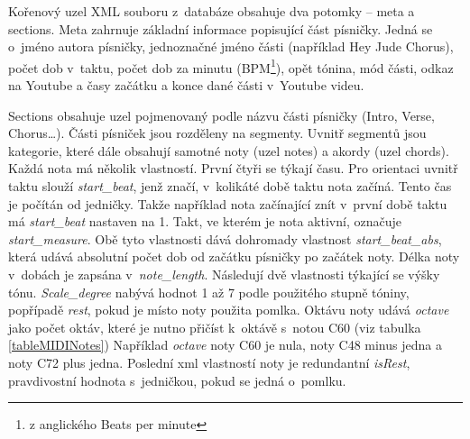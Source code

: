 Kořenový uzel XML souboru z~databáze obsahuje dva potomky -- meta a sections.
Meta zahrnuje základní informace popisující část písničky.
Jedná se o~jméno autora písničky, jednoznačné jméno části (například Hey Jude Chorus),
počet dob v~taktu, počet dob za minutu (BPM\footnote{z anglického Beats per minute}),
opět tónina, mód části,
odkaz na Youtube a časy začátku a konce dané části v~Youtube videu.
\par
Sections obsahuje uzel pojmenovaný podle názvu části písničky 
(Intro, Verse, Chorus\dots).
Části písniček jsou rozděleny na segmenty.
Uvnitř segmentů jsou kategorie, 
které dále obsahují samotné noty (uzel notes) a akordy (uzel chords). 
Každá nota má několik vlastností.
První čtyři se týkají času.
Pro orientaci uvnitř taktu slouží \emph{start\_beat}, 
jenž značí, v~kolikáté době taktu nota začíná.
Tento čas je počítán od jedničky.
Takže například nota začínající znít v~první době taktu
má \emph{start\_beat} nastaven na 1.
Takt, ve kterém je nota aktivní, označuje \emph{start\_measure}.
Obě tyto vlastnosti dává dohromady vlastnost \emph{start\_beat\_abs},
která udává absolutní počet dob od začátku písničky 
po začátek noty.
Délka noty v~dobách je zapsána v~\emph{note\_length}.
Následují dvě vlastnosti týkající se výšky tónu.
\emph{Scale\_degree} nabývá hodnot 1 až 7 podle použitého stupně tóniny,
popřípadě \emph{rest}, pokud je místo noty použita pomlka.
Oktávu noty udává \emph{octave} jako počet oktáv, 
které je nutno přičíst k~oktávě s~notou C60 (viz tabulka \ref{tableMIDINotes})
Například \emph{octave} noty C60 je nula, 
noty C48 minus jedna a noty C72 plus jedna.
Poslední xml vlastností noty je redundantní \emph{isRest},
pravdivostní hodnota s~jedničkou, pokud se jedná o~pomlku. 
\par

